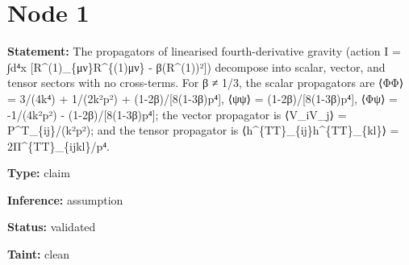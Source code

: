 
\section*{Node 1}

\textbf{Statement:} The propagators of linearised fourth-derivative gravity (action I = ∫d⁴x [R\textasciicircum{}(1)\_\{μν\}R\textasciicircum{}\{(1)μν\} - β(R\textasciicircum{}(1))²]) decompose into scalar, vector, and tensor sectors with no cross-terms. For β ≠ 1/3, the scalar propagators are ⟨ΦΦ⟩ = 3/(4k⁴) + 1/(2k²p²) + (1-2β)/[8(1-3β)p⁴], ⟨ψψ⟩ = (1-2β)/[8(1-3β)p⁴], ⟨Φψ⟩ = -1/(4k²p²) - (1-2β)/[8(1-3β)p⁴]; the vector propagator is ⟨V\_iV\_j⟩ = P\textasciicircum{}T\_\{ij\}/(k²p²); and the tensor propagator is ⟨h\textasciicircum{}\{TT\}\_\{ij\}h\textasciicircum{}\{TT\}\_\{kl\}⟩ = 2Π\textasciicircum{}\{TT\}\_\{ijkl\}/p⁴.

\textbf{Type:} claim

\textbf{Inference:} assumption

\textbf{Status:} validated

\textbf{Taint:} clean

